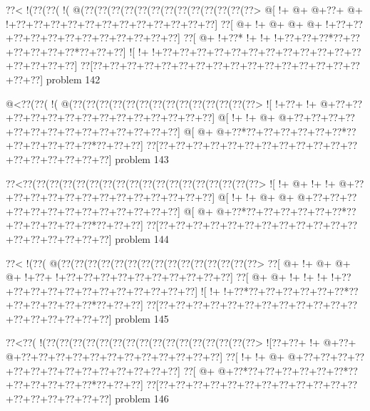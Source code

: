 \vbox{\vbox{\goo
\0??<\- !(\0??(\0??(\- !(\- @(\0??(\0??(\0??(\0??(\0??(\0??(\0??(\0??(\0??(\0??(\0??(\0??(\0??>
\- @[\- !+\- @+\- @+\0??+\- @+\- !+\0??+\0??+\0??+\0??+\0??+\0??+\0??+\0??+\0??+\0??+\0??+\0??]
\0??[\- @+\- !+\- @+\- @+\- @+\- !+\0??+\0??+\0??+\0??+\0??+\0??+\0??+\0??+\0??+\0??+\0??+\0??]
\0??[\- @+\- !+\0??*\- !+\- !+\- !+\0??+\0??+\0??*\0??+\0??+\0??+\0??+\0??+\0??*\0??+\0??+\0??]
\- ![\- !+\- !+\0??+\0??+\0??+\0??+\0??+\0??+\0??+\0??+\0??+\0??+\0??+\0??+\0??+\0??+\0??+\0??]
\0??[\0??+\0??+\0??+\0??+\0??+\0??+\0??+\0??+\0??+\0??+\0??+\0??+\0??+\0??+\0??+\0??+\0??+\0??]
}
\hfil problem 142\hfil\break
}



\vbox{\vbox{\goo
\- @<\0??(\0??(\- !(\- @(\0??(\0??(\0??(\0??(\0??(\0??(\0??(\0??(\0??(\0??(\0??(\0??(\0??(\0??>
\- ![\- !+\0??+\- !+\- @+\0??+\0??+\0??+\0??+\0??+\0??+\0??+\0??+\0??+\0??+\0??+\0??+\0??+\0??]
\- @[\- !+\- !+\- @+\- @+\0??+\0??+\0??+\0??+\0??+\0??+\0??+\0??+\0??+\0??+\0??+\0??+\0??+\0??]
\- @[\- @+\- @+\0??*\0??+\0??+\0??+\0??+\0??+\0??*\0??+\0??+\0??+\0??+\0??+\0??*\0??+\0??+\0??]
\0??[\0??+\0??+\0??+\0??+\0??+\0??+\0??+\0??+\0??+\0??+\0??+\0??+\0??+\0??+\0??+\0??+\0??+\0??]
}
\hfil problem 143\hfil\break
}



\vbox{\vbox{\goo
\0??<\0??(\0??(\0??(\0??(\0??(\0??(\0??(\0??(\0??(\0??(\0??(\0??(\0??(\0??(\0??(\0??(\0??(\0??>
\- ![\- !+\- @+\- !+\- !+\- @+\0??+\0??+\0??+\0??+\0??+\0??+\0??+\0??+\0??+\0??+\0??+\0??+\0??]
\- @[\- !+\- !+\- @+\- @+\- @+\0??+\0??+\0??+\0??+\0??+\0??+\0??+\0??+\0??+\0??+\0??+\0??+\0??]
\- @[\- @+\- @+\0??*\0??+\0??+\0??+\0??+\0??+\0??*\0??+\0??+\0??+\0??+\0??+\0??*\0??+\0??+\0??]
\0??[\0??+\0??+\0??+\0??+\0??+\0??+\0??+\0??+\0??+\0??+\0??+\0??+\0??+\0??+\0??+\0??+\0??+\0??]
}
\hfil problem 144\hfil\break
}



\vbox{\vbox{\goo
\0??<\- !(\0??(\- @(\0??(\0??(\0??(\0??(\0??(\0??(\0??(\0??(\0??(\0??(\0??(\0??(\0??(\0??(\0??>
\0??[\- @+\- !+\- @+\- @+\- @+\- !+\0??+\- !+\0??+\0??+\0??+\0??+\0??+\0??+\0??+\0??+\0??+\0??]
\0??[\- @+\- @+\- !+\- !+\- !+\- !+\0??+\0??+\0??+\0??+\0??+\0??+\0??+\0??+\0??+\0??+\0??+\0??]
\- ![\- !+\- !+\0??*\0??+\0??+\0??+\0??+\0??+\0??*\0??+\0??+\0??+\0??+\0??+\0??*\0??+\0??+\0??]
\0??[\0??+\0??+\0??+\0??+\0??+\0??+\0??+\0??+\0??+\0??+\0??+\0??+\0??+\0??+\0??+\0??+\0??+\0??]
}
\hfil problem 145\hfil\break
}



\vbox{\vbox{\goo
\0??<\0??(\- !(\0??(\0??(\0??(\0??(\0??(\0??(\0??(\0??(\0??(\0??(\0??(\0??(\0??(\0??(\0??(\0??>
\- ![\0??+\0??+\- !+\- @+\0??+\- @+\0??+\0??+\0??+\0??+\0??+\0??+\0??+\0??+\0??+\0??+\0??+\0??]
\0??[\- !+\- !+\- @+\- @+\0??+\0??+\0??+\0??+\0??+\0??+\0??+\0??+\0??+\0??+\0??+\0??+\0??+\0??]
\0??[\- @+\- @+\0??*\0??+\0??+\0??+\0??+\0??+\0??*\0??+\0??+\0??+\0??+\0??+\0??*\0??+\0??+\0??]
\0??[\0??+\0??+\0??+\0??+\0??+\0??+\0??+\0??+\0??+\0??+\0??+\0??+\0??+\0??+\0??+\0??+\0??+\0??]
}
\hfil problem 146\hfil\break
}



